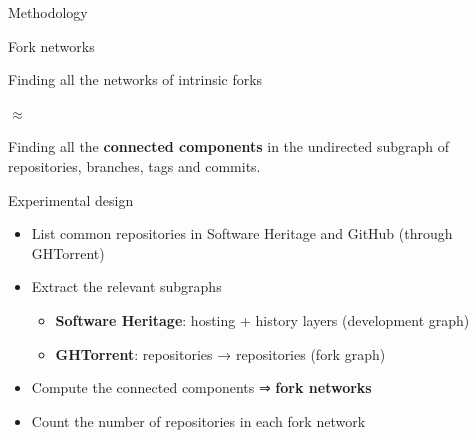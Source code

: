 \documentclass[aspectratio=169,xcolor=table]{beamer}
\begin{document}
    \begin{frame}{Methodology}
        \begin{block}{Fork networks}
            \begin{center}
                Finding all the networks of intrinsic forks

                $\approx$

                Finding all the \textbf{connected components} in the
                undirected subgraph of repositories, branches, tags and commits.
            \end{center}
        \end{block}

        \begin{block}{Experimental design}
            \begin{itemize}
                \item List common repositories in Software Heritage and GitHub
                    (through GHTorrent)
                \item Extract the relevant subgraphs
                    \begin{itemize}
                        \item \textbf{Software Heritage}: hosting + history
                            layers (development graph)
                        \item \textbf{GHTorrent}: repositories → repositories (fork graph)
                    \end{itemize}
                \item Compute the connected components ⇒ \textbf{fork networks}
                \item Count the number of repositories in each fork network
            \end{itemize}
        \end{block}
    \end{frame}
\end{document}
